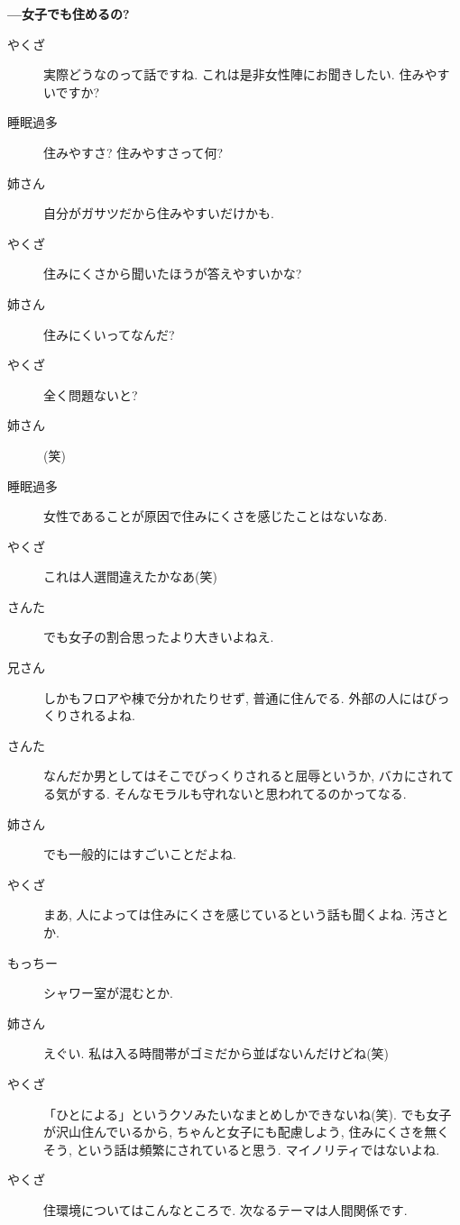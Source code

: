 \documentclass[10pt,b5jsbook,dvips,dvipdfmx,openany]{jsbook}
\theoremstyle{definition}
\begin{document}
\begin{multicols}{2}
		\textbf{---女子でも住めるの? }
		\begin{description}
		\item[やくざ]実際どうなのって話ですね. これは是非女性陣にお聞きしたい. 住みやすいですか?
		\item[睡眠過多]住みやすさ? 住みやすさって何?
		\item[姉さん]自分がガサツだから住みやすいだけかも.
		\item[やくざ]住みにくさから聞いたほうが答えやすいかな?
		\item[姉さん]住みにくいってなんだ?
		\item[やくざ]全く問題ないと?
		\item[姉さん](笑)
		\item[睡眠過多]女性であることが原因で住みにくさを感じたことはないなあ.
		\item[やくざ]これは人選間違えたかなあ(笑)
		\item[さんた]でも女子の割合思ったより大きいよねえ.
		\item[兄さん]しかもフロアや棟で分かれたりせず, 普通に住んでる. 外部の人にはびっくりされるよね.
		\item[さんた]なんだか男としてはそこでびっくりされると屈辱というか, バカにされてる気がする. そんなモラルも守れないと思われてるのかってなる.
		\item[姉さん]でも一般的にはすごいことだよね.
		\item[やくざ]まあ, 人によっては住みにくさを感じているという話も聞くよね. 汚さとか.
		\item[もっちー]シャワー室が混むとか.
		\item[姉さん]えぐい. 私は入る時間帯がゴミだから並ばないんだけどね(笑)
		\item[やくざ]「ひとによる」というクソみたいなまとめしかできないね(笑). でも女子が沢山住んでいるから, ちゃんと女子にも配慮しよう, 住みにくさを無くそう, という話は頻繁にされていると思う. マイノリティではないよね.
		\item[やくざ]住環境についてはこんなところで. 次なるテーマは人間関係です.
		\end{description}


\end{multicols}
\end{document}
